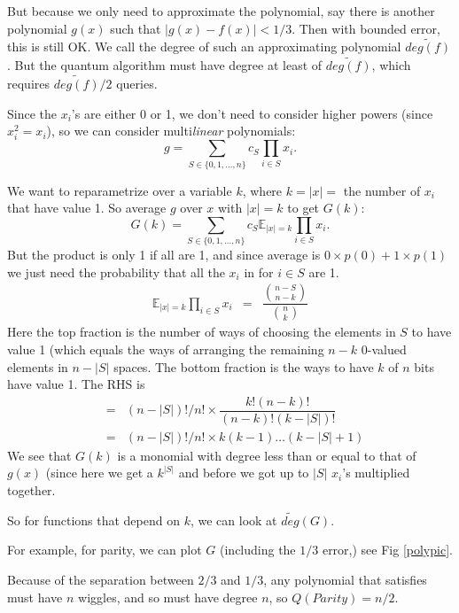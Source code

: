 \documentclass[12pt]{article}
\begin{document}
But because we only need to approximate the polynomial, say there is another polynomial $g(x)$ such that $|g(x)-f(x)|<1/3$. Then with bounded error, this is still OK. We call the degree of such an approximating polynomial $\tilde{deg(f)}$. But the quantum algorithm must have degree at least of $\tilde{deg(f)}$, which requires $\tilde{deg(f)}/2$ queries.

Since the $x_i$'s are either 0 or 1, we don't need to consider higher powers (since $x_i^2=x_i$), so we can consider multi{\it{linear}} polynomials:
$$g=\sum_{S\in\{0,1,\dots,n\}}c_S\prod_{i\in S}x_i.$$

We want to reparametrize over a variable $k$, where $k=|x|=$ the number of $x_i$ that have value 1. So average $g$ over $x$ with $|x|=k$ to get $G(k)$:
$$G(k)=\sum_{S\in\{0,1,\dots,n\}}c_S\mathbb{E}_{|x|=k}\prod_{i\in S}x_i.$$
But the product is only 1 if all are 1, and since average is $0\times p(0)+1\times p(1)$ we just need the probability that all the $x_i$ in for $i\in S$ are 1. 
\begin{eqnarray}
\mathbb{E}_{|x|=k}\prod_{i\in S}x_i&= & \dfrac{\binom{n-S}{n-k}}{\binom{n}{k}}
\end{eqnarray}
Here the top fraction is the number of ways of choosing the elements in $S$ to have value 1 (which equals the ways of arranging the remaining $n-k$ 0-valued elements in $n-|S|$ spaces. The bottom fraction is the ways to have $k$ of $n$ bits have value 1. The RHS is
\begin{eqnarray}
&=&(n-|S|)!/n! \times \dfrac{k!(n-k)!}{(n-k)!(k-|S|)!}\\
&=&(n-|S|)!/n! \times k(k-1)\dots(k-|S|+1)
\end{eqnarray}
We see that $G(k)$ is a monomial with degree less than or equal to that of $g(x)$ (since here we get a $k^{|S|}$ and before we got up to $|S|$ $x_i$'s multiplied together.

So for functions that depend on $k$, we can look at $\tilde{deg}(G)$. 


For example, for parity, we can plot $G$ (including the $1/3$ error,) see Fig \ref{polypic}.


Because of the separation between $2/3$ and $1/3$, any polynomial that satisfies must have $n$ wiggles, and so must have degree $n$, so $Q(Parity)=n/2$.
\end{document}
